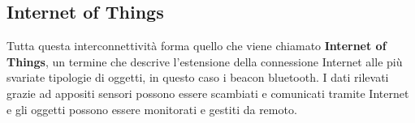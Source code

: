 \subsection{Internet of Things} Tutta questa interconnettività forma quello che viene chiamato \textbf{Internet of Things}, un termine che descrive l'estensione della connessione Internet alle più svariate tipologie di oggetti, in questo caso i beacon bluetooth. I dati rilevati grazie ad appositi sensori possono essere scambiati e comunicati tramite Internet e gli oggetti possono essere monitorati e gestiti da remoto.

